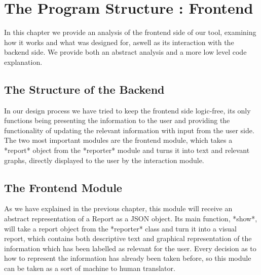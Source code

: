 %
%

\chapter{The Program Structure : Frontend}


\begin{resumen}
In this chapter we provide an analysis of the frontend side of our tool, examining how it works and what was designed for, aswell as its interaction with the backend side.
We provide both an abstract analysis and a more low level code explanation.
\end{resumen}


\section{The Structure of the Backend}
\label{cap3:sec:structure}
In our design process we have tried to keep the frontend side logic-free, its only functions being presenting the information to the user and providing the functionality of updating the relevant information with input from the user side.
The two most important modules are the frontend module, which takes a *report* object from the *reporter* module and turns it into text and relevant graphs, directly displayed to the user by the interaction module.

\section{The Frontend Module}
\label{cap3:sec:frontend}

As we have explained in the previous chapter, this module will receive an abstract representation of a Report as a JSON object. Its main function, *show*, will take a report object from the *reporter* class and turn it into a visual report, which contains both descriptive text and graphical representation of the information which has been labelled as relevant for the user.
Every decision as to how to represent the information has already been taken before, so this module can be taken as a sort of machine to human translator.


